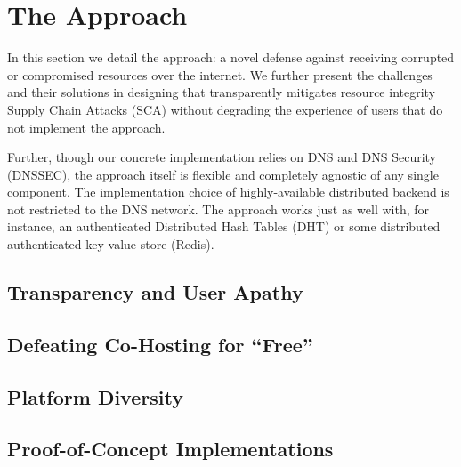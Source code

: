 \section{The \SYSTEM{} Approach} \label{sec:approach}

In this section we detail the \SYSTEM{} approach: a novel defense against
receiving corrupted or compromised resources over the internet. We further
present the challenges and their solutions in designing \SYSTEM{} that
transparently mitigates resource integrity Supply Chain Attacks (SCA) without
degrading the experience of users that do not implement the \SYSTEM{} approach.

Further, though our concrete implementation relies on DNS and DNS Security
(DNSSEC), the approach itself is flexible and completely agnostic of any single
component. The implementation choice of highly-available distributed backend is
not restricted to the DNS network. The approach works just as well with, for
instance, an authenticated Distributed Hash Tables (DHT) or some distributed
authenticated key-value store (\eg Redis).



\subsection{Transparency and User Apathy}



\subsection{Defeating Co-Hosting for ``Free''}



\subsection{Platform Diversity}



\subsection{Proof-of-Concept Implementations}



